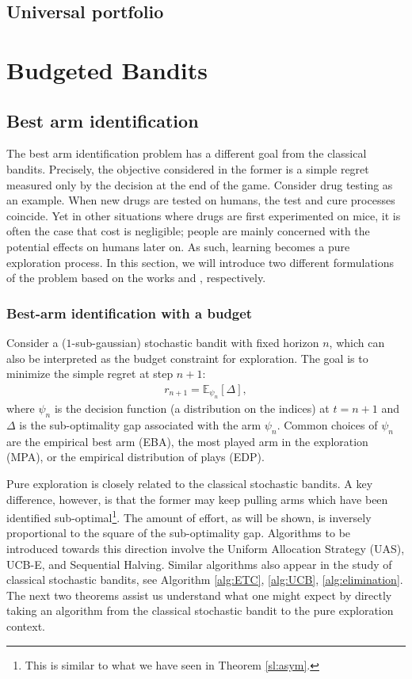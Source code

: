 \documentclass[10pt,a4article]{article}
\numberwithin{equation}{section}
\theoremstyle{plain}
\theoremstyle{definition}
\def\E{{\mathbb E}}
\begin{document}
\subsection{Universal portfolio}

\newpage

\section{Budgeted Bandits}
\subsection{Best arm identification}
The best arm identification problem has a different goal from the classical bandits. Precisely, the objective considered in the former is a simple regret measured only by the decision at the end of the game. Consider drug testing as an example. When new drugs are tested on humans, the test and cure processes coincide. Yet in other situations where drugs are first experimented on mice, it is often the case that cost is negligible; people are mainly concerned with the potential effects on humans later on. As such, learning becomes a pure exploration process. In this section, we will introduce two different formulations of the problem based on the works \cite{audibert2010best,  bubeck2009pure} and \cite{garivier2016optimal}, respectively. 

\subsubsection{Best-arm identification with a budget}

Consider a ($1$-sub-gaussian) stochastic bandit with fixed horizon $n$, which can also be interpreted as the budget constraint for exploration.  The goal is to minimize the simple regret at step $n+1$:
\begin{align*}
r_{n+1} = \E_{\psi_n}[\Delta],
\end{align*}
where $\psi_n$ is the decision function (a distribution on the indices) at $t=n+1$ and $\Delta$ is the sub-optimality gap associated with the arm $\psi_n$. Common choices of $\psi_n$ are the empirical best arm (EBA), the most played arm in the exploration (MPA), or the empirical distribution of plays (EDP). 

Pure exploration is closely related to the classical stochastic bandits. A key difference, however, is that the former may keep pulling arms which have been identified sub-optimal\footnote{This is similar to what we have seen in Theorem \ref{sl:asym}.}. The amount of effort, as will be shown, is inversely proportional to the square of the sub-optimality gap. Algorithms to be introduced towards this direction involve the Uniform Allocation Strategy (UAS),  UCB-E, and Sequential Halving. Similar algorithms also appear in the study of classical stochastic bandits, see Algorithm \ref{alg:ETC}, \ref{alg:UCB}, \ref{alg:elimination}. The next two theorems assist us understand what one might expect by directly taking an algorithm from the classical stochastic bandit to the pure exploration context. 
\end{document}
